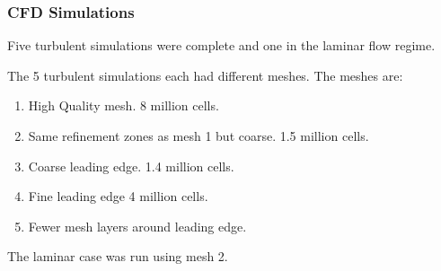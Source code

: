 \documentclass{beamer}
\begin{document}
\begin{frame}
	\frametitle{CFD Simulations}
	Five turbulent simulations were complete and one in the laminar flow regime.
	
	The 5 turbulent simulations each had different meshes. The meshes are:
	\begin{enumerate}
		\item High Quality mesh. 8 million cells.
		\item Same refinement zones as mesh 1 but coarse. 1.5 million cells.
		\item Coarse leading edge. 1.4 million cells.
		\item Fine leading edge 4 million cells.
		\item Fewer mesh layers around leading edge.
	\end{enumerate}
The laminar case was run using mesh 2.
\end{frame}
\end{document}
